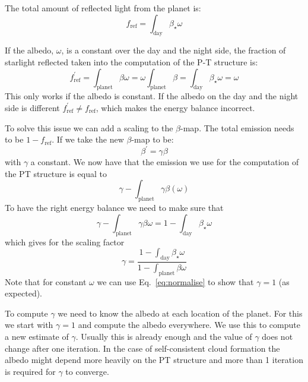 \documentclass[12pt]{article}
\begin{document}
The total amount of reflected light from the planet is:
\begin{equation}
f_\mathrm{ref}=\int_\mathrm{day}\beta_\star\omega
\end{equation}

If the albedo, $\omega$, is a constant over the day and the night side, the fraction of starlight reflected taken into the computation of the P-T structure is:
\begin{equation}
f_\mathrm{ref}^{'}=\int_\mathrm{planet}\beta\omega=\omega \int_\mathrm{planet}\beta = \int_\mathrm{day}\beta_\star\omega =\omega
\end{equation}
This only works if the albedo is constant. If the albedo on the day and the night side is different $f_\mathrm{ref}^{'} \ne f_\mathrm{ref}$, which makes the energy balance incorrect.

To solve this issue we can add a scaling to the $\beta$-map. The total emission needs to be $1-f_\mathrm{ref}$. If we take the new $\beta$-map to be:
\begin{equation}
\beta^{'}=\gamma\beta
\end{equation}
with $\gamma$ a constant. We now have that the emission we use for the computation of the PT structure is equal to
\begin{equation}
\gamma-\int_\mathrm{planet}\gamma\beta(\omega)
\end{equation}
To have the right energy balance we need to make sure that
\begin{equation}
\gamma-\int_\mathrm{planet}\gamma\beta\omega = 1-\int_\mathrm{day}\beta_\star\omega
\end{equation}
which gives for the scaling factor
\begin{equation}
\gamma=\frac{1-\int_\mathrm{day}\beta_\star\omega}{1-\int_\mathrm{planet}\beta\omega}
\end{equation}
Note that for constant $\omega$ we can use Eq.~\ref{eq:normalise} to show that $\gamma=1$ (as expected).

To compute $\gamma$ we need to know the albedo at each location of the planet. For this we start with $\gamma=1$ and compute the albedo everywhere. We use this to compute a new estimate of $\gamma$. Usually this is already enough and the value of $\gamma$ does not change after one iteration. In the case of self-consistent cloud formation the albedo might depend more heavily on the PT structure and more than 1 iteration is required for $\gamma$ to converge.
\end{document}
